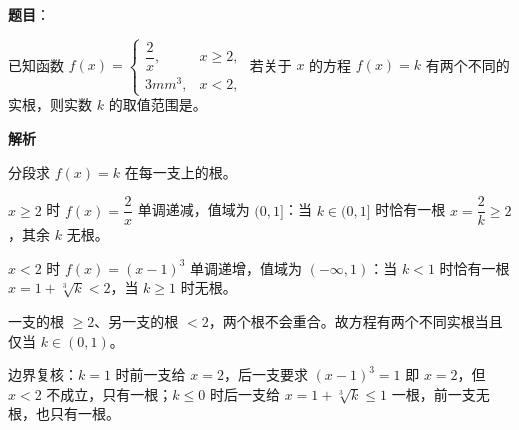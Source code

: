 \begin{answer}

\textbf{题目}：

已知函数 $f(x)=\begin{cases}\dfrac2x,&x\geqslant 2,\\3mm^3,&x<2,\end{cases}$ 若关于 $x$ 的方程 $f(x)=k$ 有两个不同的实根，则实数 $k$ 的取值范围是\gkblank{}。

\textbf{解析}

分段求 $f(x)=k$ 在每一支上的根。

$x\geqslant2$ 时 $f(x)=\dfrac2x$ 单调递减，值域为 $(0,1]$：当 $k\in(0,1]$ 时恰有一根 $x=\dfrac2k\geqslant2$，其余 $k$ 无根。

$x<2$ 时 $f(x)=(x-1)^3$ 单调递增，值域为 $(-\infty,1)$：当 $k<1$ 时恰有一根 $x=1+\sqrt[3]{k}<2$，当 $k\geqslant1$ 时无根。

一支的根 $\geqslant2$、另一支的根 $<2$，两个根不会重合。故方程有两个不同实根当且仅当 $k\in(0,1)$。

边界复核：$k=1$ 时前一支给 $x=2$，后一支要求 $(x-1)^3=1$ 即 $x=2$，但 $x<2$ 不成立，只有一根；$k\leqslant0$ 时后一支给 $x=1+\sqrt[3]{k}\leqslant1$ 一根，前一支无根，也只有一根。


\end{answer}
